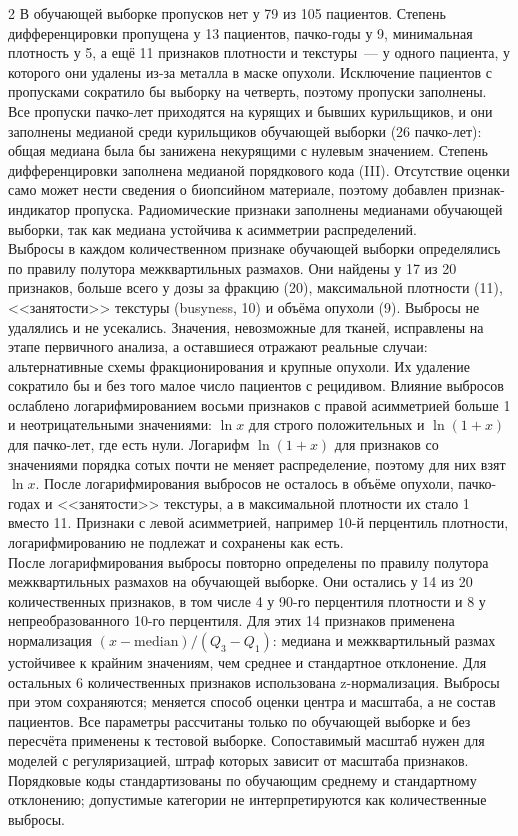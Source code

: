 \documentclass[11pt, a4paper]{article}
\begin{document}
\begin{multicols}{2}
В обучающей выборке пропусков нет у 79 из 105 пациентов. Степень дифференцировки пропущена у 13 пациентов, пачко-годы у 9, минимальная плотность у 5, а ещё 11 признаков плотности и текстуры~--- у одного пациента, у которого они удалены из-за металла в маске опухоли. Исключение пациентов с пропусками сократило бы выборку на четверть, поэтому пропуски заполнены. Все пропуски пачко-лет приходятся на курящих и бывших курильщиков, и они заполнены медианой среди курильщиков обучающей выборки (26 пачко-лет): общая медиана была бы занижена некурящими с нулевым значением. Степень дифференцировки заполнена медианой порядкового кода (III). Отсутствие оценки само может нести сведения о биопсийном материале, поэтому добавлен признак-индикатор пропуска. Радиомические признаки заполнены медианами обучающей выборки, так как медиана устойчива к асимметрии распределений.\vspace{6pt}\\
Выбросы в каждом количественном признаке обучающей выборки определялись по правилу полутора межквартильных размахов. Они найдены у 17 из 20 признаков, больше всего у дозы за фракцию (20), максимальной плотности (11), <<занятости>> текстуры (busyness, 10) и объёма опухоли (9). Выбросы не удалялись и не усекались. Значения, невозможные для тканей, исправлены на этапе первичного анализа, а оставшиеся отражают реальные случаи: альтернативные схемы фракционирования и крупные опухоли. Их удаление сократило бы и без того малое число пациентов с рецидивом. Влияние выбросов ослаблено логарифмированием восьми признаков с правой асимметрией больше 1 и неотрицательными значениями: $\ln x$ для строго положительных и $\ln(1+x)$ для пачко-лет, где есть нули. Логарифм $\ln(1+x)$ для признаков со значениями порядка сотых почти не меняет распределение, поэтому для них взят $\ln x$. После логарифмирования выбросов не осталось в объёме опухоли, пачко-годах и <<занятости>> текстуры, а в максимальной плотности их стало 1 вместо 11. Признаки с левой асимметрией, например 10-й перцентиль плотности, логарифмированию не подлежат и сохранены как есть.\vspace{6pt}\\
После логарифмирования выбросы повторно определены по правилу полутора межквартильных размахов на обучающей выборке. Они остались у 14 из 20 количественных признаков, в том числе 4 у 90-го перцентиля плотности и 8 у непреобразованного 10-го перцентиля. Для этих 14 признаков применена нормализация $(x-\mathrm{median})/(Q_3-Q_1)$: медиана и межквартильный размах устойчивее к крайним значениям, чем среднее и стандартное отклонение. Для остальных 6 количественных признаков использована z-нормализация. Выбросы при этом сохраняются; меняется способ оценки центра и масштаба, а не состав пациентов. Все параметры рассчитаны только по обучающей выборке и без пересчёта применены к тестовой выборке. Сопоставимый масштаб нужен для моделей с регуляризацией, штраф которых зависит от масштаба признаков. Порядковые коды стандартизованы по обучающим среднему и стандартному отклонению; допустимые категории не интерпретируются как количественные выбросы.\vspace{6pt}\\

\end{multicols}
\end{document}
